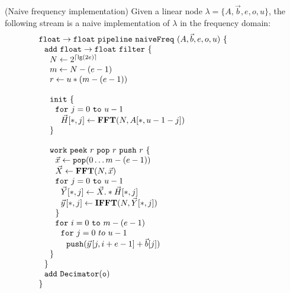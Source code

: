 \begin{transformation} (Naive frequency implementation)
Given a linear node $\lambda = \{A, {\vec b}, e, o, u\}$, the
following stream is a naive implementation of $\lambda$ in the
frequency domain: \\
\begin{equation} \nonumber
  \begin{array}{ll}

    {\tt float \rightarrow float}~{\tt pipeline~naiveFreq~}(A, {\vec b}, e, o, u){\tt ~\{} & \hspace{40pt}\\
    ~~{\tt add~float \rightarrow float~filter~\{}\\
    ~~~~N \leftarrow 2^{\lceil \lg(2e) \rceil} \\
    ~~~~m \leftarrow N-(e-1) \\
    ~~~~r \leftarrow u * (m-(e-1)) \\
    \\
    ~~~~{\tt init}~{\tt \{} \\
    ~~~~~~{\tt for}~j=0~{\tt to}~u-1\\
    ~~~~~~~~\vec{H}[*,j] \leftarrow \mathbf{FFT}(N,A[*,u-1-j]) \\
    ~~~~{\tt \}} \\
    \\
    ~~~~{\tt work}~{\tt peek}~r~{\tt pop}~r~{\tt push}~r~{\tt \{} \\
    ~~~~~~\vec{x} \leftarrow {\tt pop}(0 \dots m - (e-1)) \\
    ~~~~~~\vec{X} \leftarrow \mathbf{FFT} (N, \vec{x}) \\
    ~~~~~~{\tt for}~j=0~{\tt to}~u-1\\
    ~~~~~~~~\vec{Y}[*,j] \leftarrow \vec{X} .* \vec{H}[*,j] \\
    ~~~~~~~~\vec{y}\hspace{1pt}[*,j] \leftarrow \mathbf{IFFT}(N, \vec{Y}[*,j]) \\
    ~~~~~~{\tt \}} \\
    ~~~~~~{\tt for}~i=0~{\tt to}~m-(e-1)\\
    ~~~~~~~~{\tt for}~j=0~to~u-1\\
    ~~~~~~~~~~{\tt push}(\vec{y}\hspace{1pt}[j,i+e-1] + {\vec b}[j])\\
    ~~~~{\tt \}} \\
    ~~{\tt \}} \\
    ~~{\tt add~Decimator(o)} \\
    {\tt \}} \\
  \end{array}
\end{equation}
\label{trans:freq1}
\end{transformation}

